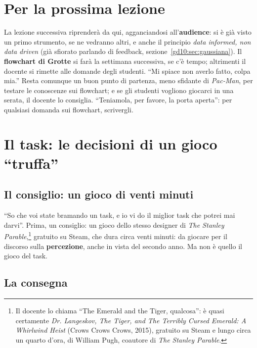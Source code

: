 \section{Per la prossima lezione}
\label{gd15:sec:prossima}

La lezione successiva riprenderà da qui, agganciandosi
all'\textbf{audience}: si è già visto un primo strumento, se ne vedranno
altri, e anche il principio \emph{data informed, non data driven} (già
sfiorato parlando di feedback, sezione~\ref{gd10:sec:gaussiana}). Il
\textbf{flowchart di Grotte} si farà la settimana successiva, se c'è tempo;
altrimenti il docente si rimette alle domande degli studenti. ``Mi spiace non
averlo fatto, colpa mia.'' Resta comunque un buon punto di partenza, meno
sfidante di \emph{Pac-Man}, per testare le conoscenze sui flowchart; e se
gli studenti vogliono giocarci in una serata, il docente lo consiglia.
``Teniamola, per favore, la porta aperta'': per qualsiasi domanda sui
flowchart, scrivergli.

\section{Il task: le decisioni di un gioco ``truffa''}
\label{gd15:sec:task}

\subsection{Il consiglio: un gioco di venti minuti}

``So che voi state bramando un task, e io vi do il miglior task che potrei
mai darvi''. Prima, un consiglio: un gioco dello stesso designer di
\emph{The Stanley Parable},\footnote{Il docente lo chiama ``The Emerald and
the Tiger, qualcosa'': è quasi certamente \emph{Dr. Langeskov, The Tiger,
and The Terribly Cursed Emerald: A Whirlwind Heist} (Crows Crows Crows,
2015), gratuito su Steam e lungo circa un quarto d'ora, di William Pugh,
coautore di \emph{The Stanley Parable}.} gratuito su Steam, che dura circa
venti minuti: da giocare per il discorso sulla \textbf{percezione}, anche in
vista del secondo anno. Ma non è quello il gioco del task.

\subsection{La consegna}

